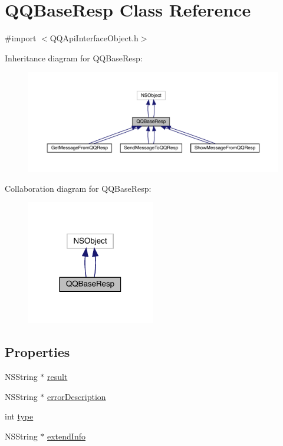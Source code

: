 \hypertarget{interface_q_q_base_resp}{}\section{Q\+Q\+Base\+Resp Class Reference}
\label{interface_q_q_base_resp}


{\ttfamily \#import $<$Q\+Q\+Api\+Interface\+Object.\+h$>$}



Inheritance diagram for Q\+Q\+Base\+Resp\+:\nopagebreak
\begin{figure}[H]
\begin{center}
\leavevmode
\includegraphics[width=350pt]{interface_q_q_base_resp__inherit__graph}
\end{center}
\end{figure}


Collaboration diagram for Q\+Q\+Base\+Resp\+:\nopagebreak
\begin{figure}[H]
\begin{center}
\leavevmode
\includegraphics[width=158pt]{interface_q_q_base_resp__coll__graph}
\end{center}
\end{figure}
\subsection*{Properties}
\begin{DoxyCompactItemize}
\item 
N\+S\+String $\ast$ \mbox{\hyperlink{interface_q_q_base_resp_a616bf7765b2b46203c82de0584cff92c}{result}}
\item 
N\+S\+String $\ast$ \mbox{\hyperlink{interface_q_q_base_resp_a069068fff5cb62fd4e44fedec690a64b}{error\+Description}}
\item 
int \mbox{\hyperlink{interface_q_q_base_resp_ad2597dde05de203fe8abf701f1e13485}{type}}
\item 
N\+S\+String $\ast$ \mbox{\hyperlink{interface_q_q_base_resp_a0beff6a9dd16eeeb04f0e415f84f91de}{extend\+Info}}
\end{DoxyCompactItemize}



